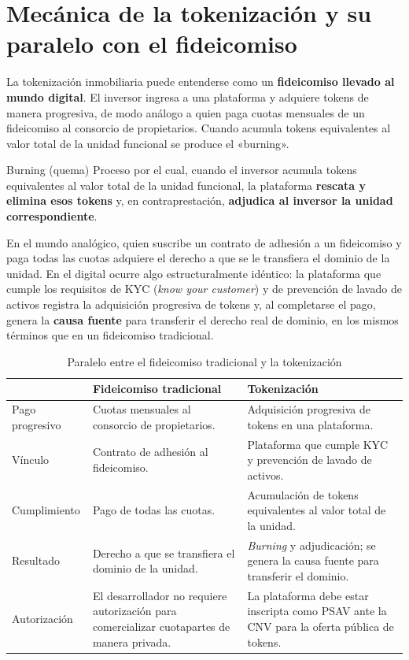 \documentclass[12pt,oneside]{book}
\begin{document}
\section{Mecánica de la tokenización y su paralelo con el fideicomiso}

La tokenización inmobiliaria puede entenderse como un \textbf{fideicomiso llevado al mundo digital}. El inversor ingresa a una plataforma y adquiere tokens de manera progresiva, de modo análogo a quien paga cuotas mensuales de un fideicomiso al consorcio de propietarios. Cuando acumula tokens equivalentes al valor total de la unidad funcional se produce el «burning».

\begin{definition}{Burning (quema)}
Proceso por el cual, cuando el inversor acumula tokens equivalentes al valor total de la unidad funcional, la plataforma \textbf{rescata y elimina esos tokens} y, en contraprestación, \textbf{adjudica al inversor la unidad correspondiente}.
\end{definition}

En el mundo analógico, quien suscribe un contrato de adhesión a un fideicomiso y paga todas las cuotas adquiere el derecho a que se le transfiera el dominio de la unidad. En el digital ocurre algo estructuralmente idéntico: la plataforma que cumple los requisitos de KYC (\emph{know your customer}) y de prevención de lavado de activos registra la adquisición progresiva de tokens y, al completarse el pago, genera la \textbf{causa fuente} para transferir el derecho real de dominio, en los mismos términos que en un fideicomiso tradicional.

\begin{table}[H]
\centering
\caption{Paralelo entre el fideicomiso tradicional y la tokenización}
\renewcommand{\arraystretch}{1.2}
\begin{tabularx}{\textwidth}{>{\raggedright\arraybackslash}p{}XX}
\toprule
& \textbf{Fideicomiso tradicional} & \textbf{Tokenización} \\
\midrule
Pago progresivo & Cuotas mensuales al consorcio de propietarios. & Adquisición progresiva de tokens en una plataforma. \\
Vínculo & Contrato de adhesión al fideicomiso. & Plataforma que cumple KYC y prevención de lavado de activos. \\
Cumplimiento & Pago de todas las cuotas. & Acumulación de tokens equivalentes al valor total de la unidad. \\
Resultado & Derecho a que se transfiera el dominio de la unidad. & \emph{Burning} y adjudicación; se genera la causa fuente para transferir el dominio. \\
Autorización & El desarrollador no requiere autorización para comercializar cuotapartes de manera privada. & La plataforma debe estar inscripta como PSAV ante la CNV para la oferta pública de tokens. \\
\bottomrule
\end{tabularx}
\end{table}
\end{document}
